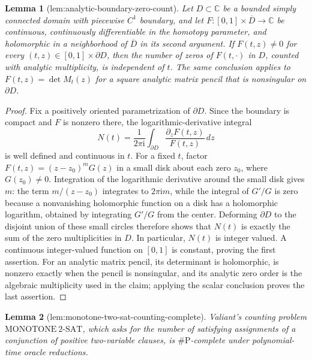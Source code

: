 \documentclass{article}
\newtheorem{lemma}{Lemma}
\begin{document}
\begin{lemma}[lem:analytic-boundary-zero-count]\label{lem:analytic-boundary-zero-count}
Let \(D\subset\mathbb C\) be a bounded simply connected domain with piecewise \(C^1\) boundary, and let \(F:[0,1]\times\overline D\to\mathbb C\) be continuous, continuously differentiable in the homotopy parameter, and holomorphic in a neighborhood of \(\overline D\) in its second argument. If \(F(t,z)\neq0\) for every \((t,z)\in[0,1]\times\partial D\), then the number of zeros of \(F(t,\cdot)\) in \(D\), counted with analytic multiplicity, is independent of \(t\). The same conclusion applies to \(F(t,z)=\det M_t(z)\) for a square analytic matrix pencil that is nonsingular on \(\partial D\).
\end{lemma}
\begin{proof}
Fix a positively oriented parametrization of \(\partial D\). Since the boundary is compact and \(F\) is nonzero there, the logarithmic-derivative integral
\[
 N(t)=\frac{1}{2\pi\mathrm i}\int_{\partial D}
       \frac{\partial_zF(t,z)}{F(t,z)}\,dz
\]
is well defined and continuous in \(t\). For a fixed \(t\), factor \(F(t,z)=(z-z_0)^mG(z)\) in a small disk about each zero \(z_0\), where \(G(z_0)\neq0\). Integration of the logarithmic derivative around the small disk gives \(m\): the term \(m/(z-z_0)\) integrates to \(2\pi\mathrm i m\), while the integral of \(G'/G\) is zero because a nonvanishing holomorphic function on a disk has a holomorphic logarithm, obtained by integrating \(G'/G\) from the center. Deforming \(\partial D\) to the disjoint union of these small circles therefore shows that \(N(t)\) is exactly the sum of the zero multiplicities in \(D\). In particular, \(N(t)\) is integer valued. A continuous integer-valued function on \([0,1]\) is constant, proving the first assertion. For an analytic matrix pencil, its determinant is holomorphic, is nonzero exactly when the pencil is nonsingular, and its analytic zero order is the algebraic multiplicity used in the claim; applying the scalar conclusion proves the last assertion.
\end{proof}

\begin{lemma}[lem:monotone-two-sat-counting-complete]\label{lem:monotone-two-sat-counting-complete}
Valiant's counting problem \(\mathrm{MONOTONE\ 2\mbox{-}SAT}\), which asks for the number of satisfying assignments of a conjunction of positive two-variable clauses, is \(\#\mathrm P\)-complete under polynomial-time oracle reductions.
\end{lemma}
\end{document}
